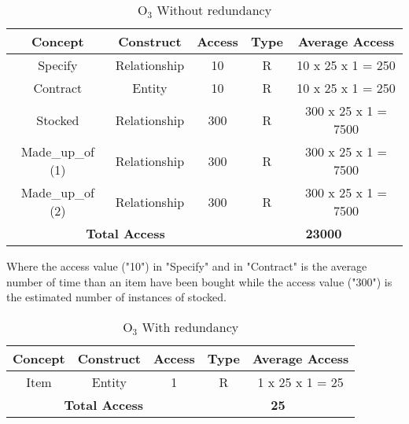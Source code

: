 \begin{table}[!h]\caption{	$ \textrm{O}_\textrm{3} $ Without redundancy }
	\begin{center}
		\begin{tabular}{| c | c | c | c | c |}
			\hline
			\textbf{Concept} & \textbf{Construct} & \textbf{Access} & \textbf{Type} & \textbf{Average Access} \\ \hline
			Specify & Relationship & 10 & R & 10 x 25 x 1 = 250 \\ \hline
			Contract & Entity & 10 & R & 10 x 25 x 1 = 250 \\ \hline
			Stocked & Relationship & 300 & R & 300 x 25 x 1 = 7500 \\ \hline
            Made\_up\_of (1) & Relationship & 300 & R & 300 x 25 x 1 = 7500 \\ \hline
            Made\_up\_of (2) & Relationship & 300 & R & 300 x 25 x 1 = 7500 \\ \hline
			\multicolumn{3}{|c|}{\textbf{Total Access}} & \multicolumn{2}{|c|}{\textbf{23000}} \\ \hline
		\end{tabular}
	\end{center}
\end{table}

Where the access value ("10") in "Specify" and in "Contract" is the average number of time than an item have been bought while the access value ("300") is the estimated number of instances of stocked.

\begin{table}[!h]\caption{	$ \textrm{O}_\textrm{3} $ With redundancy }
	\begin{center}
		\begin{tabular}{| c | c | c | c | c |}
			\hline
			\textbf{Concept} & \textbf{Construct} & \textbf{Access} & \textbf{Type} & \textbf{Average Access} \\ \hline
			Item & Entity & 1 & R & 1 x 25 x 1 = 25 \\ \hline
			\multicolumn{3}{|c|}{\textbf{Total Access}} & \multicolumn{2}{|c|}{\textbf{25}} \\ \hline
		\end{tabular}
	\end{center}
\end{table}



